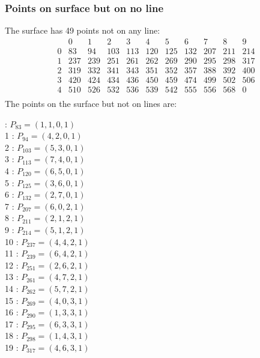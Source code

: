 \documentclass{article}
\begin{document}
{\subsubsection*{Points on surface but on no line}
The surface has 49 points not on any line:\\
$$
\begin{array}{r|*{10}{r}}
 & 0 & 1 & 2 & 3 & 4 & 5 & 6 & 7 & 8 & 9\\
\hline
0 & 83 & 94 & 103 & 113 & 120 & 125 & 132 & 207 & 211 & 214\\
1 & 237 & 239 & 251 & 261 & 262 & 269 & 290 & 295 & 298 & 317\\
2 & 319 & 332 & 341 & 343 & 351 & 352 & 357 & 388 & 392 & 400\\
3 & 420 & 424 & 434 & 436 & 450 & 459 & 474 & 499 & 502 & 506\\
4 & 510 & 526 & 532 & 536 & 539 & 542 & 555 & 556 & 568 & 0\\
\end{array}
$$
The points on the surface but not on lines are:\\
\begin{multicols}{2}
 : $P_{83}=( 1, 1, 0, 1 )$\\
1 : $P_{94}=( 4, 2, 0, 1 )$\\
2 : $P_{103}=( 5, 3, 0, 1 )$\\
3 : $P_{113}=( 7, 4, 0, 1 )$\\
4 : $P_{120}=( 6, 5, 0, 1 )$\\
5 : $P_{125}=( 3, 6, 0, 1 )$\\
6 : $P_{132}=( 2, 7, 0, 1 )$\\
7 : $P_{207}=( 6, 0, 2, 1 )$\\
8 : $P_{211}=( 2, 1, 2, 1 )$\\
9 : $P_{214}=( 5, 1, 2, 1 )$\\
10 : $P_{237}=( 4, 4, 2, 1 )$\\
11 : $P_{239}=( 6, 4, 2, 1 )$\\
12 : $P_{251}=( 2, 6, 2, 1 )$\\
13 : $P_{261}=( 4, 7, 2, 1 )$\\
14 : $P_{262}=( 5, 7, 2, 1 )$\\
15 : $P_{269}=( 4, 0, 3, 1 )$\\
16 : $P_{290}=( 1, 3, 3, 1 )$\\
17 : $P_{295}=( 6, 3, 3, 1 )$\\
18 : $P_{298}=( 1, 4, 3, 1 )$\\
19 : $P_{317}=( 4, 6, 3, 1 )$\\

\end{multicols}}
\end{document}
